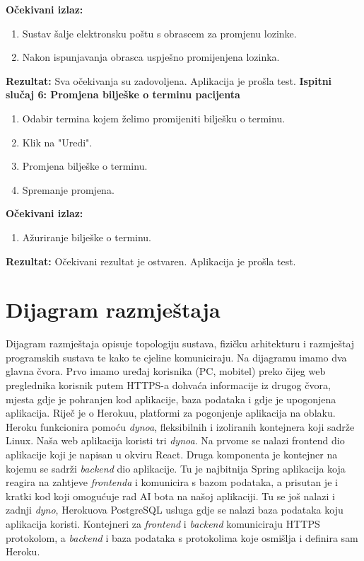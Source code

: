 			\textbf{Očekivani izlaz:}
			\begin{enumerate}
				\item Sustav šalje elektronsku poštu s obrascem za promjenu lozinke.
				\item Nakon ispunjavanja obrasca uspješno promijenjena lozinka.
			\end{enumerate}
			\textbf{Rezultat:} Sva očekivanja su zadovoljena. \color{green} Aplikacija je prošla test. \color{black} \newline
			\textbf{Ispitni slučaj 6: Promjena bilješke o terminu pacijenta}
			\begin{enumerate}
				\item Odabir termina kojem želimo promijeniti bilješku o terminu.
				\item Klik na "Uredi".
				\item Promjena bilješke o terminu.
				\item Spremanje promjena.
			\end{enumerate}
			\textbf{Očekivani izlaz:}
			\begin{enumerate}
				\item Ažuriranje bilješke o terminu.
			\end{enumerate}
			\textbf{Rezultat:} Očekivani rezultat je ostvaren. \color{green} Aplikacija je prošla test. \color{black} \newline

			
			\eject 
		
		
		\section{Dijagram razmještaja}
						
			Dijagram razmještaja opisuje topologiju sustava, fizičku arhitekturu i razmještaj programskih sustava te kako te cjeline komuniciraju. Na dijagramu imamo dva glavna čvora. Prvo imamo uređaj korisnika (PC, mobitel) preko čijeg web preglednika korisnik putem HTTPS-a dohvaća informacije iz drugog čvora, mjesta gdje je pohranjen kod aplikacije, baza podataka i gdje je upogonjena aplikacija. Riječ je o Herokuu, platformi za pogonjenje aplikacija na oblaku. Heroku funkcionira pomoću \textit{dynoa}, fleksibilnih i izoliranih kontejnera koji sadrže Linux. Naša web aplikacija koristi tri \textit{dynoa}. Na prvome se nalazi frontend dio aplikacije koji je napisan u okviru React. Druga komponenta je kontejner na kojemu se sadrži \textit{backend} dio aplikacije. Tu je najbitnija Spring aplikacija koja reagira na zahtjeve \textit{frontenda} i komunicira s bazom podataka, a prisutan je i kratki kod koji omogućuje rad AI bota na našoj aplikaciji. Tu se još nalazi i zadnji \textit{dyno}, Herokuova PostgreSQL usluga gdje se nalazi baza podataka koju aplikacija koristi. Kontejneri za \textit{frontend} i \textit{backend} komuniciraju HTTPS protokolom, a \textit{backend} i baza podataka s protokolima koje osmišlja i definira sam Heroku.

